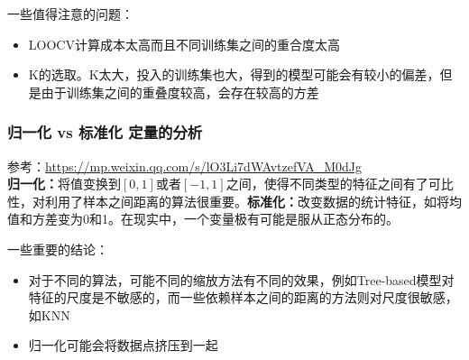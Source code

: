 一些值得注意的问题：
\begin{itemize}
	\item LOOCV计算成本太高而且不同训练集之间的重合度太高
	\item K的选取。K太大，投入的训练集也大，得到的模型可能会有较小的偏差，但是由于训练集之间的重叠度较高，会存在较高的方差
\end{itemize}


\subsubsection{归一化 vs 标准化 定量的分析}
参考：\href{https://mp.weixin.qq.com/s/lO3Li7dWAvtzefVA_M0dJg}{https://mp.weixin.qq.com/s/lO3Li7dWAvtzefVA\_M0dJg}\\
\textbf{归一化：}将值变换到$[0, 1]$或者$[-1, 1]$之间，使得不同类型的特征之间有了可比性，对利用了样本之间距离的算法很重要。\textbf{标准化：}改变数据的统计特征，如将均值和方差变为0和1。在现实中，一个变量极有可能是服从正态分布的。


一些重要的结论：
\begin{itemize}
	\item 对于不同的算法，可能不同的缩放方法有不同的效果，例如Tree-based模型对特征的尺度是不敏感的，而一些依赖样本之间的距离的方法则对尺度很敏感，如KNN
	\item 归一化可能会将数据点挤压到一起
\end{itemize}

